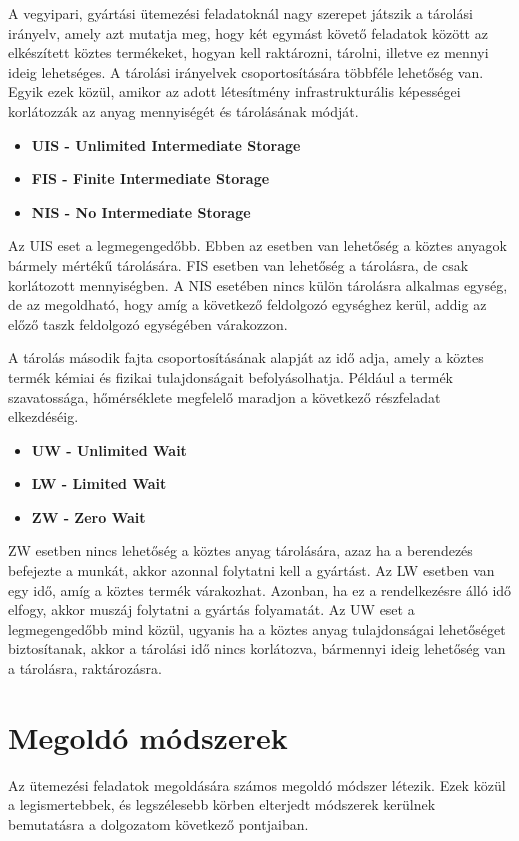\newpage
A vegyipari, gyártási ütemezési feladatoknál nagy szerepet játszik a tárolási irányelv, amely azt mutatja meg, hogy két egymást követő feladatok között az elkészített köztes termékeket, hogyan kell raktározni, tárolni, illetve ez mennyi ideig lehetséges. A tárolási irányelvek csoportosítására többféle lehetőség van. Egyik ezek közül, amikor az adott létesítmény infrastrukturális képességei korlátozzák az anyag mennyiségét és tárolásának módját.
\begin{itemize}
	\item \textbf{UIS - Unlimited Intermediate Storage}
	\item \textbf{FIS - Finite Intermediate Storage}
	\item \textbf{NIS - No Intermediate Storage}
\end{itemize}
Az UIS eset a legmegengedőbb. Ebben az esetben van lehetőség a köztes anyagok bármely mértékű tárolására. FIS esetben van lehetőség a tárolásra, de csak korlátozott mennyiségben. A NIS esetében nincs külön tárolásra alkalmas egység, de az megoldható, hogy amíg a következő feldolgozó egységhez kerül, addig az előző taszk feldolgozó egységében várakozzon.	

A tárolás második fajta csoportosításának alapját az idő adja, amely a köztes termék kémiai és fizikai tulajdonságait befolyásolhatja. Például a termék szavatossága, hőmérséklete megfelelő maradjon a következő részfeladat elkezdéséig.	
\begin{itemize}
	\item \textbf{UW - Unlimited Wait}
	\item \textbf{LW - Limited Wait}
	\item \textbf{ZW - Zero Wait}	
\end{itemize}
ZW esetben nincs lehetőség a köztes anyag tárolására, azaz ha a berendezés befejezte a munkát, akkor azonnal folytatni kell a gyártást. Az LW esetben van egy idő, amíg a köztes termék várakozhat. Azonban, ha ez a rendelkezésre álló idő elfogy, akkor muszáj folytatni a gyártás folyamatát. Az UW eset a legmegengedőbb mind közül, ugyanis ha a köztes anyag tulajdonságai lehetőséget biztosítanak, akkor a tárolási idő nincs korlátozva, bármennyi ideig lehetőség van a tárolásra, raktározásra.
\newpage
\section{Megoldó módszerek}
Az ütemezési feladatok megoldására számos megoldó módszer létezik. Ezek közül a legismertebbek, és legszélesebb körben elterjedt módszerek kerülnek bemutatásra a dolgozatom következő pontjaiban.
